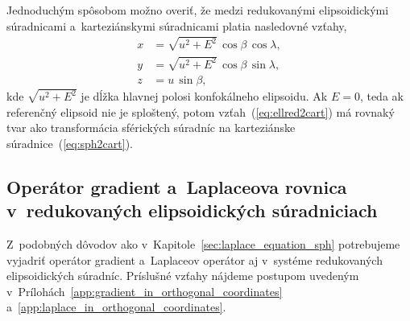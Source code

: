 \documentclass[a4paper,12pt]{book}
\begin{document}
Jednoduchým spôsobom možno overiť, že medzi redukovanými elipsoidickými 
súradnicami a~karteziánskymi súradnicami platia nasledovné vzťahy,
%
\begin{equation}
\label{eq:ellred2cart}
\begin{split}
x &= \sqrt{u^2 + E^2} \, \cos\beta \, \cos\lambda{,}\\
y &= \sqrt{u^2 + E^2} \, \cos\beta \, \sin\lambda{,}\\
z &= u \, \sin\beta{,}
\end{split}
\end{equation}
%
kde $\sqrt{u^2 + E^2}$ je dĺžka hlavnej polosi konfokálneho elipsoidu.  Ak $E 
= 0$, teda ak referenčný elipsoid nie je sploštený, potom 
vzťah~(\ref{eq:ellred2cart}) má rovnaký tvar ako transformácia sférických 
súradníc na karteziánske súradnice~(\ref{eq:sph2cart}).



\subsection{Operátor gradient a~Laplaceova rovnica v~redukovaných 
elipsoidických súradniciach}
\label{sec:gradient_and_laplace_in_reduced_ell_coords}

Z~podobných dôvodov ako v~Kapitole~\ref{sec:laplace_equation_sph} potrebujeme 
vyjadriť operátor gradient a~Laplaceov operátor aj v~systéme redukovaných 
elipsoidických súradníc.  Príslušné vzťahy nájdeme postupom uvedeným 
v~Prílohách~\ref{app:gradient_in_orthogonal_coordinates} 
a~\ref{app:laplace_in_orthogonal_coordinates}.
\end{document}
